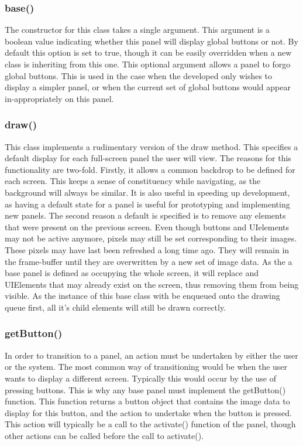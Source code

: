 \subsubsection{base()}

The constructor for this class takes a single argument. This argument is a boolean value indicating whether this panel will display global buttons or not. By default this option is set to true, though it can be easily overridden when a new class is inheriting from this one. This optional argument allows a panel to forgo global buttons. This is used in the case when the developed only wishes to display a simpler panel, or when the current set of global buttons would appear in-appropriately on this panel.

\subsubsection{draw()}

This class implements a rudimentary version of the draw method. This specifies a default display for each full-screen panel the user will view. The reasons for this functionality are two-fold. Firstly, it allows a common backdrop to be defined for each screen. This keeps a sense of constituency while navigating, as the background will always be similar. It is also useful in speeding up development, as having a default state for a panel is useful for prototyping and implementing new panels. The second reason a default is specified is to remove any elements that were present on the previous screen. Even though buttons and UIelements may not be active anymore, pixels may still be set corresponding to their images. These pixels may have last been refreshed a long time ago. They will remain in the frame-buffer until they are overwritten by a new set of image data. As the a base panel is defined as occupying the whole screen, it will replace and UIElements that may already exist on the screen, thus removing them from being visible. As the instance of this base class with be enqueued onto the drawing queue first, all it's child elements will still be drawn correctly.

\subsubsection{getButton()}

In order to transition to a panel, an action must be undertaken by either the user or the system. The most common way of transitioning would be when the user wants to display a different screen. Typically this would occur by the use of pressing buttons. This is why any base panel must implement the getButton() function. This function returns a button object that contains the image data to display for this button, and the action to undertake when the button is pressed. This action will typically be a call to the activate() function of the panel, though other actions can be called before the call to activate().

